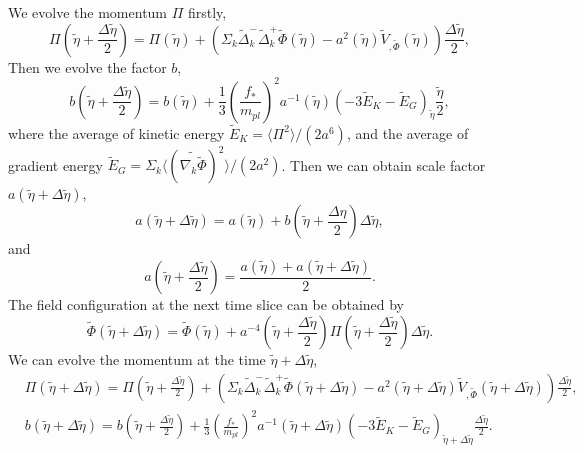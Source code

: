\documentclass[12pt, a4paper]{article}
\begin{document}
We evolve the momentum $\Pi$ firstly,
\begin{equation}
  \Pi\left(\tilde{\eta}+\frac{\Delta\tilde{\eta}}{2}\right)=\Pi\left(\tilde{\eta}\right)+\left(\Sigma_k \tilde{\Delta}^{-}_{k}\tilde{\Delta}^{+}_k\tilde{\Phi}\left(\tilde{\eta}\right)-a^2\left(\tilde{\eta}\right)\tilde{V}_{,\tilde{\Phi}}\left(\tilde{\eta}\right)\right)\frac{\Delta\tilde{\eta}}{2},
\end{equation}
Then we evolve the factor $b$,
\begin{equation}
  b\left(\tilde{\eta}+\frac{\Delta\tilde{\eta}}{2}\right)=b\left(\tilde{\eta}\right)+\frac{1}{3}\left(\frac{f_*}{m_{pl}}\right)^2 a^{-1}\left(\tilde{\eta}\right)\left(-3\tilde{E}_K-\tilde{E}_G\right)_{\tilde{\eta}}\frac{\tilde{\eta}}{2},
\end{equation}
where the average of kinetic energy $\tilde{E}_K=\langle\Pi^2\rangle/(2a^6)$, and the average of gradient energy $\tilde{E}_G=\Sigma_k\langle(\tilde{\nabla_k\tilde{\Phi}})^2\rangle/(2a^2)$.
Then we can obtain scale factor $a\left(\tilde{\eta}+\Delta\tilde{\eta}\right)$,
\begin{equation}
  a\left(\tilde{\eta}+\Delta\tilde{\eta}\right)=a\left(\tilde{\eta}\right)+b\left(\tilde{\eta}+\frac{\Delta\eta}{2}\right)\Delta\tilde{\eta},
\end{equation}
and
\begin{equation}
  a\left(\tilde{\eta}+\frac{\Delta\tilde{\eta}}{2}\right)=\frac{a\left(\tilde{\eta}\right)+a\left(\tilde{\eta}+\Delta\tilde{\eta}\right)}{2}.
\end{equation}
The field configuration at the next time slice can be obtained by
\begin{equation}
  \tilde{\Phi}\left(\tilde{\eta}+\Delta\tilde{\eta}\right)=\tilde{\Phi}\left(\tilde{\eta}\right)+a^{-4}\left(\tilde{\eta}+\frac{\Delta\tilde{\eta}}{2}\right)\Pi\left(\tilde{\eta}+\frac{\Delta\tilde{\eta}}{2}\right)\Delta\tilde{\eta}.
\end{equation}
We can evolve the momentum at the time $\tilde{\eta}+\Delta\tilde{\eta}$,
\begin{align}
&\Pi\left(\tilde{\eta}+\Delta\tilde{\eta}\right)=\Pi\left(\tilde{\eta}+\frac{\Delta\tilde{\eta}}{2}\right)+\left(\Sigma_k \tilde{\Delta}^{-}_{k}\tilde{\Delta}^{+}_k\tilde{\Phi}\left(\tilde{\eta}+\Delta\tilde{\eta}\right)-a^2\left(\tilde{\eta}+\Delta\tilde{\eta}\right)\tilde{V}_{,\tilde{\Phi}}\left(\tilde{\eta}+\Delta\tilde{\eta}\right)\right)\frac{\Delta\tilde{\eta}}{2},\nonumber \\
&b\left(\tilde{\eta}+\Delta\tilde{\eta}\right) = b\left(\tilde{\eta}+\frac{\Delta\tilde{\eta}}{2}\right)+\frac{1}{3}\left(\frac{f_*}{m_{pl}}\right)^2 a^{-1}\left(\tilde{\eta}+\Delta\tilde{\eta}\right)\left(-3\tilde{E}_K-\tilde{E}_G\right)_{\tilde{\eta}+\Delta\tilde{\eta}}\frac{\Delta\tilde{\eta}}{2}.
\end{align}
\end{document}
